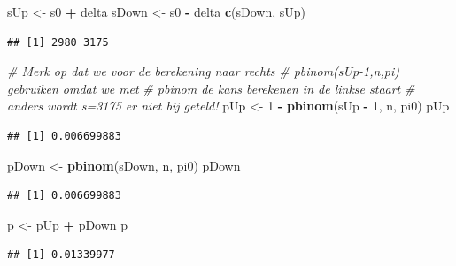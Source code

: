 \documentclass[
  12pt,dutch]{book}
\newenvironment{Shaded}{\begin{snugshade}}{\end{snugshade}}
\newcommand{\CommentTok}[1]{\textcolor[rgb]{0.56,0.35,0.01}{\textit{#1}}}
\newcommand{\DecValTok}[1]{\textcolor[rgb]{0.00,0.00,0.81}{#1}}
\newcommand{\FunctionTok}[1]{\textcolor[rgb]{0.13,0.29,0.53}{\textbf{#1}}}
\newcommand{\NormalTok}[1]{#1}
\newcommand{\OtherTok}[1]{\textcolor[rgb]{0.56,0.35,0.01}{#1}}
\newcommand{\SpecialCharTok}[1]{\textcolor[rgb]{0.81,0.36,0.00}{\textbf{#1}}}
\theoremstyle{definition}
\theoremstyle{definition}
\theoremstyle{definition}
\theoremstyle{definition}
\theoremstyle{remark}
\begin{document}
\begin{Shaded}
\begin{Highlighting}[]
\NormalTok{sUp }\OtherTok{\textless{}{-}}\NormalTok{ s0 }\SpecialCharTok{+}\NormalTok{ delta}
\NormalTok{sDown }\OtherTok{\textless{}{-}}\NormalTok{ s0 }\SpecialCharTok{{-}}\NormalTok{ delta}
\FunctionTok{c}\NormalTok{(sDown, sUp)}
\end{Highlighting}
\end{Shaded}

\begin{verbatim}
## [1] 2980 3175
\end{verbatim}

\begin{Shaded}
\begin{Highlighting}[]
\CommentTok{\# Merk op dat we voor de berekening naar rechts}
\CommentTok{\# pbinom(sUp{-}1,n,pi) gebruiken omdat we met}
\CommentTok{\# pbinom de kans berekenen in de linkse staart}
\CommentTok{\# anders wordt s=3175 er niet bij geteld!}
\NormalTok{pUp }\OtherTok{\textless{}{-}} \DecValTok{1} \SpecialCharTok{{-}} \FunctionTok{pbinom}\NormalTok{(sUp }\SpecialCharTok{{-}} \DecValTok{1}\NormalTok{, n, pi0)}
\NormalTok{pUp}
\end{Highlighting}
\end{Shaded}

\begin{verbatim}
## [1] 0.006699883
\end{verbatim}

\begin{Shaded}
\begin{Highlighting}[]
\NormalTok{pDown }\OtherTok{\textless{}{-}} \FunctionTok{pbinom}\NormalTok{(sDown, n, pi0)}
\NormalTok{pDown}
\end{Highlighting}
\end{Shaded}

\begin{verbatim}
## [1] 0.006699883
\end{verbatim}

\begin{Shaded}
\begin{Highlighting}[]
\NormalTok{p }\OtherTok{\textless{}{-}}\NormalTok{ pUp }\SpecialCharTok{+}\NormalTok{ pDown}
\NormalTok{p}
\end{Highlighting}
\end{Shaded}

\begin{verbatim}
## [1] 0.01339977
\end{verbatim}
\end{document}
